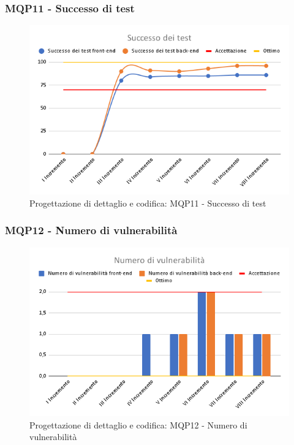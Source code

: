 \subsubsection{MQP11 - Successo di test}
\begin{figure}[H]
    \centering
    \includegraphics[scale=0.50]{Sezioni/images/pb_prodotto/Successo_dei_test.png}
    \caption{Progettazione di dettaglio e codifica: MQP11 - Successo di test}
\end{figure}
\subsubsection{MQP12 - Numero di vulnerabilità}
\begin{figure}[H]
    \centering
    \includegraphics[scale=0.50]{Sezioni/images/pb_prodotto/Numero_di_vulnerabilita.png}
    \caption{Progettazione di dettaglio e codifica: MQP12 - Numero di vulnerabilità}
\end{figure}
